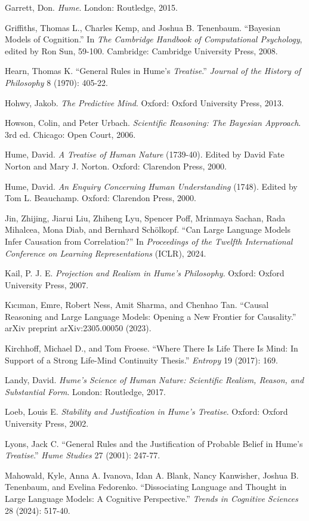 \documentclass[11pt]{article}
\begin{document}
Garrett, Don. \emph{Hume}. London: Routledge, 2015.

Griffiths, Thomas L., Charles Kemp, and Joshua B. Tenenbaum. ``Bayesian Models of Cognition.'' In \emph{The Cambridge Handbook of Computational Psychology}, edited by Ron Sun, 59-100. Cambridge: Cambridge University Press, 2008.

Hearn, Thomas K. ``General Rules in Hume's \emph{Treatise}.'' \emph{Journal of the History of Philosophy} 8 (1970): 405-22.

Hohwy, Jakob. \emph{The Predictive Mind}. Oxford: Oxford University Press, 2013.

Howson, Colin, and Peter Urbach. \emph{Scientific Reasoning: The Bayesian Approach}. 3rd ed. Chicago: Open Court, 2006.

Hume, David. \emph{A Treatise of Human Nature} (1739-40). Edited by David Fate Norton and Mary J. Norton. Oxford: Clarendon Press, 2000.

Hume, David. \emph{An Enquiry Concerning Human Understanding} (1748). Edited by Tom L. Beauchamp. Oxford: Clarendon Press, 2000.

Jin, Zhijing, Jiarui Liu, Zhiheng Lyu, Spencer Poff, Mrinmaya Sachan, Rada Mihalcea, Mona Diab, and Bernhard Sch\"olkopf. ``Can Large Language Models Infer Causation from Correlation?'' In \emph{Proceedings of the Twelfth International Conference on Learning Representations} (ICLR), 2024.

Kail, P. J. E. \emph{Projection and Realism in Hume's Philosophy}. Oxford: Oxford University Press, 2007.

K{\i}c{\i}man, Emre, Robert Ness, Amit Sharma, and Chenhao Tan. ``Causal Reasoning and Large Language Models: Opening a New Frontier for Causality.'' arXiv preprint arXiv:2305.00050 (2023).

Kirchhoff, Michael D., and Tom Froese. ``Where There Is Life There Is Mind: In Support of a Strong Life-Mind Continuity Thesis.'' \emph{Entropy} 19 (2017): 169.

Landy, David. \emph{Hume's Science of Human Nature: Scientific Realism, Reason, and Substantial Form}. London: Routledge, 2017.

Loeb, Louis E. \emph{Stability and Justification in Hume's Treatise}. Oxford: Oxford University Press, 2002.

Lyons, Jack C. ``General Rules and the Justification of Probable Belief in Hume's \emph{Treatise}.'' \emph{Hume Studies} 27 (2001): 247-77.

Mahowald, Kyle, Anna A. Ivanova, Idan A. Blank, Nancy Kanwisher, Joshua B. Tenenbaum, and Evelina Fedorenko. ``Dissociating Language and Thought in Large Language Models: A Cognitive Perspective.'' \emph{Trends in Cognitive Sciences} 28 (2024): 517-40.
\end{document}
